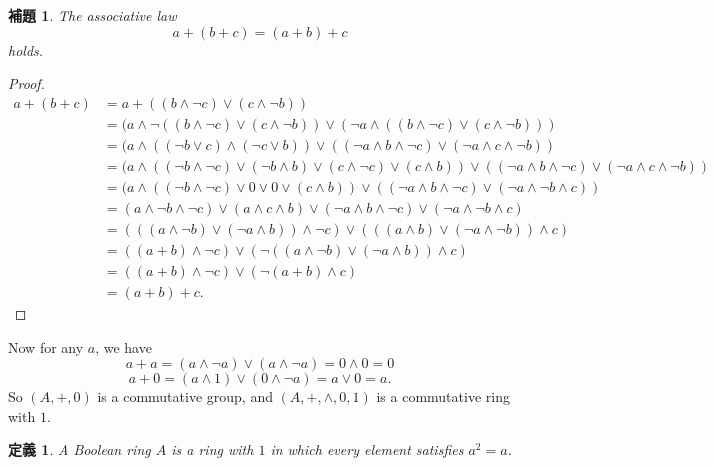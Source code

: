 \documentclass[a4j,12pt]{jarticle}
\numberwithin{equation}{section}
\newtheorem{dfn}{定義}[section]
\newtheorem{lemma}[thm]{補題}
\begin{document}
\begin{lemma}
  The associative law
  \begin{equation}
    a+(b+c) = (a+b)+c
  \end{equation}
  holds.
\end{lemma}
\begin{proof}
  \begin{align*}
    a+(b+c) &= a+((b \wedge \neg c) \vee (c \wedge \neg b)) \\
            &= (a \wedge \neg ((b \wedge \neg c) \vee (c \wedge \neg b)) \vee (\neg a \wedge ((b \wedge \neg c) \vee (c \wedge \neg b))) \\
            &= (a \wedge ((\neg b \vee c) \wedge (\neg c \vee b)) \vee ((\neg a \wedge b \wedge \neg c) \vee (\neg a \wedge c \wedge \neg b)) \\
            &= (a \wedge ((\neg b \wedge \neg c) \vee (\neg b \wedge b) \vee (c \wedge \neg c) \vee (c \wedge b)) \vee ((\neg a \wedge b \wedge \neg c) \vee (\neg a \wedge c \wedge \neg b)) \\
            &= (a \wedge ((\neg b \wedge \neg c) \vee 0 \vee 0 \vee (c \wedge b)) \vee ((\neg a \wedge b \wedge \neg c) \vee (\neg a \wedge \neg b \wedge c)) \\
            &= (a \wedge \neg b \wedge \neg c) \vee (a \wedge c \wedge b) \vee (\neg a \wedge b \wedge \neg c) \vee (\neg a \wedge \neg b \wedge c) \\
            &= (((a \wedge \neg b) \vee (\neg a \wedge b )) \wedge \neg c) \vee (((a \wedge b) \vee  (\neg a \wedge \neg b)) \wedge c) \\
            &= ((a+b) \wedge \neg c) \vee (\neg ((a \wedge \neg b) \vee  (\neg a \wedge b)) \wedge c) \\
            &= ((a+b) \wedge \neg c) \vee (\neg (a+b) \wedge c) \\
            &= (a+b) + c.
  \end{align*}
\end{proof}
Now for any $a$, we have
\begin{equation}
  a+a=(a \wedge \neg a) \vee (a \wedge \neg a) = 0 \wedge 0=0
\end{equation}
\begin{equation}
  a + 0 = (a \wedge 1) \vee (0 \wedge \neg a) = a \vee 0 = a.
\end{equation}
So $(A, +, 0)$ is a commutative group, and $(A, +, \wedge, 0, 1)$ is a commutative ring with $1$.
\begin{dfn}
  A Boolean ring $A$ is a ring with $1$ in which every element satisfies $a^2 = a$.
\end{dfn}
\end{document}
